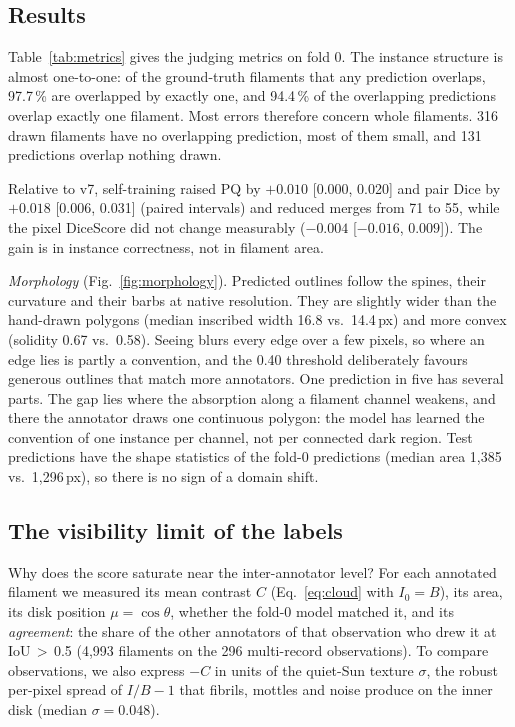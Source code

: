 \documentclass[sigconf]{acmart}
\begin{document}
\subsection{Results}
Table~\ref{tab:metrics} gives the judging metrics on fold 0. The instance structure is almost one-to-one: of the ground-truth filaments that any prediction overlaps, 97.7\,\% are overlapped by exactly one, and 94.4\,\% of the overlapping predictions overlap exactly one filament. Most errors therefore concern whole filaments. 316 drawn filaments have no overlapping prediction, most of them small, and 131 predictions overlap nothing drawn.

Relative to v7, self-training raised PQ by $+0.010$ [0.000, 0.020] and pair Dice by $+0.018$ [0.006, 0.031] (paired intervals) and reduced merges from 71 to 55, while the pixel DiceScore did not change measurably ($-0.004$ [$-0.016$, $0.009$]). The gain is in instance correctness, not in filament area.

\emph{Morphology} (Fig.~\ref{fig:morphology}). Predicted outlines follow the spines, their curvature and their barbs at native resolution. They are slightly wider than the hand-drawn polygons (median inscribed width 16.8 vs.\ 14.4\,px) and more convex (solidity 0.67 vs.\ 0.58). Seeing blurs every edge over a few pixels, so where an edge lies is partly a convention, and the 0.40 threshold deliberately favours generous outlines that match more annotators. One prediction in five has several parts. The gap lies where the absorption along a filament channel weakens, and there the annotator draws one continuous polygon: the model has learned the convention of one instance per channel, not per connected dark region. Test predictions have the shape statistics of the fold-0 predictions (median area 1,385 vs.\ 1,296\,px), so there is no sign of a domain shift.

\subsection{The visibility limit of the labels}
Why does the score saturate near the inter-annotator level? For each annotated filament we measured its mean contrast $C$ (Eq.~\eqref{eq:cloud} with $I_0=B$), its area, its disk position $\mu=\cos\theta$, whether the fold-0 model matched it, and its \emph{agreement}: the share of the other annotators of that observation who drew it at IoU\,$>$\,0.5 (4,993 filaments on the 296 multi-record observations). To compare observations, we also express $-C$ in units of the quiet-Sun texture $\sigma$, the robust per-pixel spread of $I/B-1$ that fibrils, mottles and noise produce on the inner disk (median $\sigma=0.048$).
\end{document}
